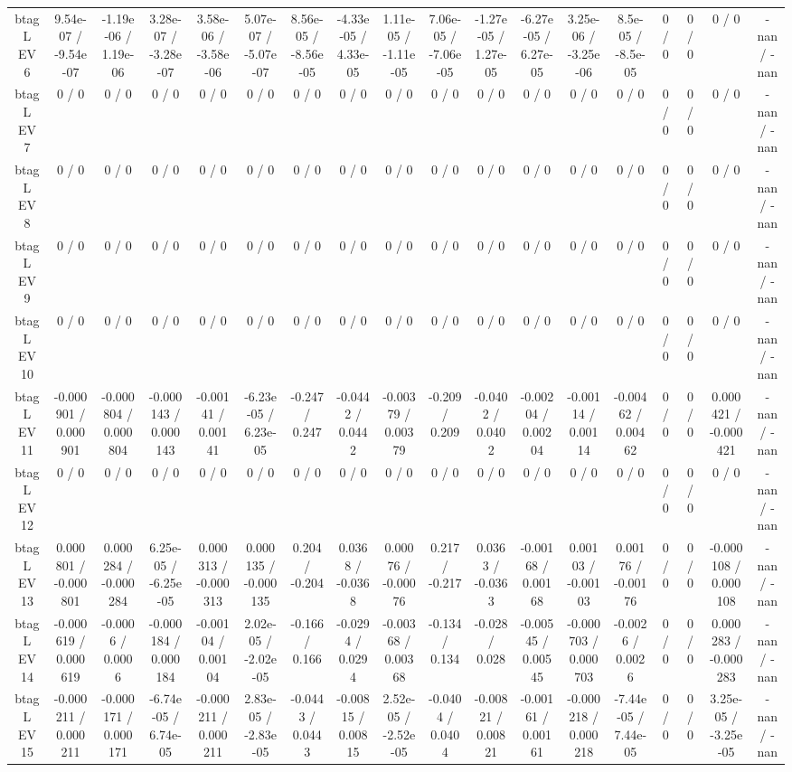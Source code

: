 \documentclass[10pt]{article}
\begin{document}
\begin{table}[htbp]
\begin{center}
\begin{tabular}{|c|c|c|c|c|c|c|c|c|c|c|c|c|c|c|c|c|c|}
  btag L EV 6 & 9.54e-07 / -9.54e-07 & -1.19e-06 / 1.19e-06 & 3.28e-07 / -3.28e-07 & 3.58e-06 / -3.58e-06 & 5.07e-07 / -5.07e-07 & 8.56e-05 / -8.56e-05 & -4.33e-05 / 4.33e-05 & 1.11e-05 / -1.11e-05 & 7.06e-05 / -7.06e-05 & -1.27e-05 / 1.27e-05 & -6.27e-05 / 6.27e-05 & 3.25e-06 / -3.25e-06 & 8.5e-05 / -8.5e-05 & 0 / 0 & 0 / 0 & 0 / 0 & -nan / -nan \\ 
  btag L EV 7 & 0 / 0 & 0 / 0 & 0 / 0 & 0 / 0 & 0 / 0 & 0 / 0 & 0 / 0 & 0 / 0 & 0 / 0 & 0 / 0 & 0 / 0 & 0 / 0 & 0 / 0 & 0 / 0 & 0 / 0 & 0 / 0 & -nan / -nan \\ 
  btag L EV 8 & 0 / 0 & 0 / 0 & 0 / 0 & 0 / 0 & 0 / 0 & 0 / 0 & 0 / 0 & 0 / 0 & 0 / 0 & 0 / 0 & 0 / 0 & 0 / 0 & 0 / 0 & 0 / 0 & 0 / 0 & 0 / 0 & -nan / -nan \\ 
  btag L EV 9 & 0 / 0 & 0 / 0 & 0 / 0 & 0 / 0 & 0 / 0 & 0 / 0 & 0 / 0 & 0 / 0 & 0 / 0 & 0 / 0 & 0 / 0 & 0 / 0 & 0 / 0 & 0 / 0 & 0 / 0 & 0 / 0 & -nan / -nan \\ 
  btag L EV 10 & 0 / 0 & 0 / 0 & 0 / 0 & 0 / 0 & 0 / 0 & 0 / 0 & 0 / 0 & 0 / 0 & 0 / 0 & 0 / 0 & 0 / 0 & 0 / 0 & 0 / 0 & 0 / 0 & 0 / 0 & 0 / 0 & -nan / -nan \\ 
  btag L EV 11 & -0.000901 / 0.000901 & -0.000804 / 0.000804 & -0.000143 / 0.000143 & -0.00141 / 0.00141 & -6.23e-05 / 6.23e-05 & -0.247 / 0.247 & -0.0442 / 0.0442 & -0.00379 / 0.00379 & -0.209 / 0.209 & -0.0402 / 0.0402 & -0.00204 / 0.00204 & -0.00114 / 0.00114 & -0.00462 / 0.00462 & 0 / 0 & 0 / 0 & 0.000421 / -0.000421 & -nan / -nan \\ 
  btag L EV 12 & 0 / 0 & 0 / 0 & 0 / 0 & 0 / 0 & 0 / 0 & 0 / 0 & 0 / 0 & 0 / 0 & 0 / 0 & 0 / 0 & 0 / 0 & 0 / 0 & 0 / 0 & 0 / 0 & 0 / 0 & 0 / 0 & -nan / -nan \\ 
  btag L EV 13 & 0.000801 / -0.000801 & 0.000284 / -0.000284 & 6.25e-05 / -6.25e-05 & 0.000313 / -0.000313 & 0.000135 / -0.000135 & 0.204 / -0.204 & 0.0368 / -0.0368 & 0.00076 / -0.00076 & 0.217 / -0.217 & 0.0363 / -0.0363 & -0.00168 / 0.00168 & 0.00103 / -0.00103 & 0.00176 / -0.00176 & 0 / 0 & 0 / 0 & -0.000108 / 0.000108 & -nan / -nan \\ 
  btag L EV 14 & -0.000619 / 0.000619 & -0.0006 / 0.0006 & -0.000184 / 0.000184 & -0.00104 / 0.00104 & 2.02e-05 / -2.02e-05 & -0.166 / 0.166 & -0.0294 / 0.0294 & -0.00368 / 0.00368 & -0.134 / 0.134 & -0.028 / 0.028 & -0.00545 / 0.00545 & -0.000703 / 0.000703 & -0.0026 / 0.0026 & 0 / 0 & 0 / 0 & 0.000283 / -0.000283 & -nan / -nan \\ 
  btag L EV 15 & -0.000211 / 0.000211 & -0.000171 / 0.000171 & -6.74e-05 / 6.74e-05 & -0.000211 / 0.000211 & 2.83e-05 / -2.83e-05 & -0.0443 / 0.0443 & -0.00815 / 0.00815 & 2.52e-05 / -2.52e-05 & -0.0404 / 0.0404 & -0.00821 / 0.00821 & -0.00161 / 0.00161 & -0.000218 / 0.000218 & -7.44e-05 / 7.44e-05 & 0 / 0 & 0 / 0 & 3.25e-05 / -3.25e-05 & -nan / -nan \\ 

\end{tabular}
\end{center}
\end{table}
\end{document}
